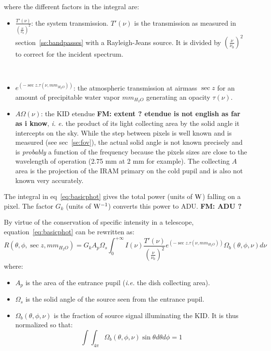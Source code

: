 
where the different factors in the integral are:
\begin{itemize}
\item $\frac{T'(\nu)}{\left(\frac{\nu}{\nu_{0}}\right)^{2}}$:  the
  system transmission. $T'(\nu)$ is the transmission as measured in
  section~\ref{se:bandpasses} with a Rayleigh-Jeans source. It is
  divided by $\left(\frac{\nu}{\nu_{0}}\right)^{2}$ to correct for the
  incident spectrum.
   
   \\

\item $e^{\left(-\sec z . \tau(\nu,  mm_{H_{2}O} )\right)}$: the
  atmospheric transmission at airmass  $\sec z$ for an amount of
  precipitable water vapor $mm_{H_{2}O}$ generating an opacity $\tau(\nu)$.
\item $A\Omega (\nu) $: the KID etendue   {\bf FM: extent ? etendue is not english as far as i know}, {\it i. e.} the product of
  its light collecting area by the solid angle it intercepts on the
  sky. While the step between  pixels is well known and is measured (see sec~\ref{se:fov}), the
  actual solid angle is not known precisely and is {\em probably} a function of the
  frequency  because the pixels sizes are close to the wavelength of
  operation (2.75 mm at 2 mm for example). The collecting $A$ area is the
  projection of the IRAM primary on the cold pupil and is also not
  known very accurately.
\end{itemize}
The integral in eq~\ref{eq:basicphot} gives the total power (units of $\rm W$)
falling on a pixel. The factor $G_{k}$ (units of  $\rm W^{-1}$) converts this
power to ADU. {\bf FM:  ADU ?}

By virtue of the conservation of specific intensity in a telescope,
equation~\ref{eq:basicphot} can be rewritten as:
\begin{equation}
R(\theta, \phi, \sec z, mm_{H_{2}O}) = G_{k} A_{p}\Omega_{s}\int_{0}^{+\infty} I(\nu)
\frac{T'(\nu)}{\left(\frac{\nu}{\nu_{0}}\right)^{2}} e^{\left(-\sec z
  . \tau(\nu,  mm_{H_{2}O})\right)} \Omega_{b} (\theta, \phi, \nu)  d\nu 
\label{eq:basicphot2}
\end{equation}
where:
\begin{itemize}
\item $A_{p}$ is the area of the entrance pupil ({\it i.e.} the
  dish collecting area).
\item $\Omega_{s}$ is the solid angle of the source seen from the
  entrance pupil.
\item $\Omega_{b}(\theta, \phi, \nu)$ is the fraction of source signal
  illuminating the KID. It is thus normalized so that:
\begin{equation}
\int\int_{4\pi} \Omega_{b}(\theta, \phi, \nu) \sin \theta d\theta
d\phi = 1 
\label{eq:omegabdef}
\end{equation}
\end{itemize}

